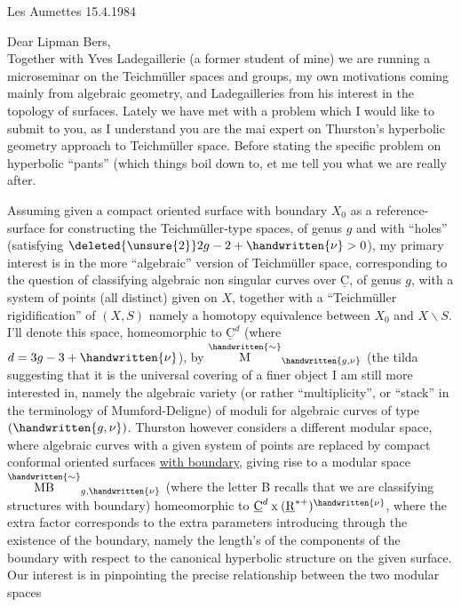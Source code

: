

\begin{flushright}Les Aumettes 15.4.1984\\\end{flushright}
Dear Lipman Bers,\\

Together with Yves Ladegaillerie (a former student of mine) we are running a microseminar on the Teichmüller spaces and groups, my own motivations coming mainly from algebraic geometry, and Ladegailleries from his interest in the topology of surfaces. Lately we have met with a problem which I would like to submit to you, as I understand you are the mai expert on Thurston's hyperbolic geometry approach to Teichmüller space. Before stating the specific problem on hyperbolic ``pants'' (which things boil down to\handwritten{)}, et me tell you what we are really after.

Assuming given a compact oriented surface with boundary $X_0$  as a reference-surface for constructing the Teichmüller-type spaces, of genus $g$ and with \quad ``holes'' (satisfying $\deleted{\unsure{2}}2g-2+\handwritten{\nu}>0$), my primary interest is in the more ``algebraic'' version of Teichmüller space, corresponding to the question of classifying algebraic non singular curves over $\underline{\mathrm C}$, of genus $g$, with a system of \quad points (all distinct) given on $X$, together with a ``Teichmüller rigidification'' of $(X,S)$ namely a homotopy equivalence between $X_0$ and $X\backslash S$. I'll denote this space, homeomorphic to $\underline{\mathrm C}^{d}$ (where $d=3g-3+\handwritten{\nu}$), by $\overset{\handwritten{\sim}}{\mathrm M}_{\handwritten{g,\nu}}$ (the tilda suggesting that it is the universal covering of a finer object I am still more interested in, namely the algebraic variety (or rather ``multiplicity'', or ``stack'' in the terminology of Mumford-Deligne) of moduli for algebraic curves of type $(\handwritten{g,\nu})$. Thurston however considers a different modular space, where algebraic curves with a given system of points are replaced by compact conformal oriented surfaces \uline{with boundary}, giving rise to a modular space $\overset{\handwritten{\sim}}{\mathrm{MB}}_{g,\handwritten{\nu}}$ (where the letter B recalls that we are classifying structures with boundary) homeomorphic to $\underline{\mathrm C}^{d}\mathbin{\mathrm x}(\underline{\mathrm R}^{*+})^{\handwritten{\nu}}$, where the extra factor  corresponds to the extra parameters introducing through the existence of the boundary, namely the length's of the  components of the boundary with respect to the canonical hyperbolic structure on the given surface. Our interest is in pinpointing the precise relationship between the two modular spaces

